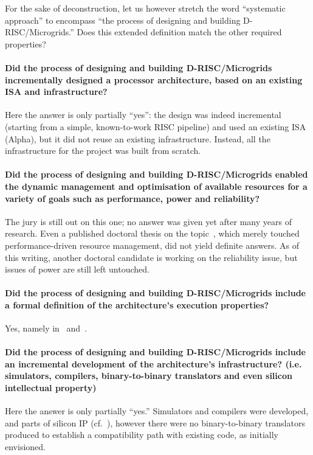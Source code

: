 For the sake of deconstruction, let us however stretch the word
``systematic approach'' to encompass ``the process of designing and
building D-RISC/Microgrids.'' Does this extended definition match the
other required properties?

\paragraph{Did the process of designing and building D-RISC/Microgrids incrementally designed a processor architecture, based on an existing ISA and infrastructure?} Here the answer is only partially ``yes'': the design was indeed incremental (starting from a simple, known-to-work RISC pipeline) and used an existing ISA (Alpha), but it did not reuse an existing infrastructure. Instead, all the infrastructure for the project was built from scratch.

\paragraph{Did the process of designing and building D-RISC/Microgrids enabled the dynamic management and optimisation of available resources for a variety of goals such as performance, power and reliability?} The jury is still out on this one; no answer was given yet after many years of research. Even a published doctoral thesis on the topic~\cite{vantol.13}, which merely touched performance-driven resource management, did not yield definite answers. As of this writing, another doctoral candidate is working on the reliability issue, but issues of power are still left untouched.

\paragraph{Did the process of designing and building D-RISC/Microgrids include a formal definition of the architecture's execution properties?} Yes, namely in~\cite{tdvu.07.icfem} and~\cite[Chap.~7]{poss.12}.

\paragraph{Did the process of designing and building D-RISC/Microgrids include an incremental development of the architecture's infrastructure? (i.e. simulators, compilers, binary-to-binary translators and even silicon intellectual property)} Here the answer
is only partially ``yes.'' Simulators and compilers were developed,
and parts of silicon IP (cf.~\cite{danek.12}), however there were no
binary-to-binary translators produced to establish a compatibility
path with existing code, as initially envisioned.

